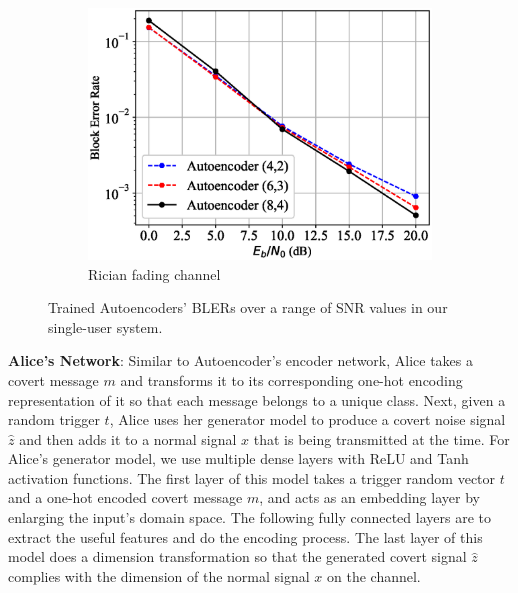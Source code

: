 \begin{figure}[!tp]
\begin{subfigure}{0.3\textwidth}
		\includegraphics[width=\linewidth]{figs/autoencoder_bler_rician}
		\caption{Rician fading channel}	
	\end{subfigure}
	\caption{Trained Autoencoders' BLERs over a range of SNR values in our single-user system.}
	\label{fig:autoencoder_bler}
\end{figure}

\textbf{Alice's Network}: Similar to Autoencoder's encoder network, Alice takes a covert message \(m\) and transforms it to its corresponding one-hot encoding representation of it so that each message belongs to a unique class. Next, given a random trigger \(t\), Alice uses her generator model to produce a covert noise signal \(\hat{z}\) and then adds it to a normal signal \(x\) that is being transmitted at the time. For Alice's generator model, we use multiple dense layers with ReLU and Tanh activation functions. The first layer of this model takes a trigger random vector \(t\) and a one-hot encoded covert message \(m\), and acts as an embedding layer by enlarging the input's domain space. The following fully connected layers are to extract the useful features and do the encoding process. The last layer of this model does a dimension transformation so that the generated covert signal \(\hat{z}\) complies with the dimension of the normal signal \(x\) on the channel. 

